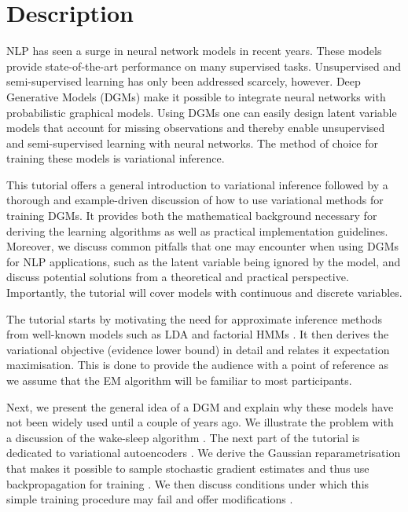 \section{Description}

NLP has seen a surge in neural network models in recent years. These models provide state-of-the-art
performance on many supervised tasks. Unsupervised and semi-supervised learning has only been
addressed scarcely, however. Deep Generative Models (DGMs) make it possible to integrate neural networks
with probabilistic graphical models. Using DGMs one can easily design latent variable models that
account for missing observations and thereby enable unsupervised and semi-supervised learning
with neural networks. The method of choice for training these models is variational inference.

This tutorial offers a general introduction to variational inference followed by a thorough and 
example-driven discussion of how to use variational methods for training DGMs. It provides both 
the mathematical background necessary for deriving the learning algorithms as well as practical
implementation guidelines. Moreover, we discuss common pitfalls that one may encounter when using
DGMs for NLP applications, such as the latent variable being ignored by the model, and discuss
potential solutions from a theoretical and practical perspective. Importantly, the tutorial
will cover models with continuous and discrete variables.

The tutorial starts by motivating the need for approximate inference methods from well-known models
such as LDA \citep{BleiEtAl:2003} and factorial HMMs \citep{GhahramaniJordan:1996}. It then derives the variational objective (evidence lower bound) in
detail and relates it expectation maximisation. This is done to provide the audience with
a point of reference as we assume that the EM algorithm will be familiar to most participants.

Next, we present the general idea of a DGM and
explain why these models have not been widely used until a couple of years ago. We illustrate
the problem with a discussion of the wake-sleep algorithm \citep{HintonEtAl:1995}. 
The next part of the tutorial
is dedicated to variational autoencoders \citep{KingmaWelling:2013, RezendeEtAl:2014}. We derive the Gaussian reparametrisation that makes
it possible to sample stochastic gradient estimates and thus use backpropagation for training
\citep{KingmaWelling:2013, RezendeEtAl:2014, TitsiasLazarogredilla:2014}.
We then discuss conditions under which this simple training procedure may fail and offer modifications
\cite[e.g. downscaling the KL-term of the variational objective][]{BowmanEtAl:2016}. 

